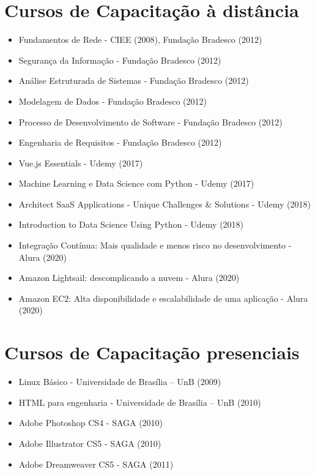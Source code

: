 \section{Cursos de Capacitação à distância}
\begin{itemize}
    \item Fundamentos de Rede - CIEE (2008), Fundação Bradesco (2012)
    \item Segurança da Informação - Fundação Bradesco (2012)
    \item Análise Estruturada de Sistemas - Fundação Bradesco (2012)
    \item Modelagem de Dados - Fundação Bradesco (2012)
    \item Processo de Desenvolvimento de Software - Fundação Bradesco (2012)
    \item Engenharia de Requisitos - Fundação Bradesco (2012)
    \item Vue.js Essentials - Udemy (2017)
    \item Machine Learning e Data Science com Python - Udemy (2017)
    \item Architect SaaS Applications - Unique Challenges & Solutions - Udemy (2018)
    \item Introduction to Data Science Using Python - Udemy (2018)
    \item Integração Contínua: Mais qualidade e menos risco no desenvolvimento - Alura (2020)
    \item Amazon Lightsail: descomplicando a nuvem - Alura (2020)
    \item Amazon EC2: Alta disponibilidade e escalabilidade de uma aplicação - Alura (2020)
\end{itemize}

\section{Cursos de Capacitação presenciais}
\begin{itemize}
    \item Linux Básico - Universidade de Brasília – UnB (2009)
    \item HTML para engenharia - Universidade de Brasília – UnB (2010)
    \item Adobe Photoshop CS4 - SAGA (2010)
    \item Adobe Illustrator CS5 - SAGA (2010)
    \item Adobe Dreamweaver CS5 - SAGA (2011)
\end{itemize}